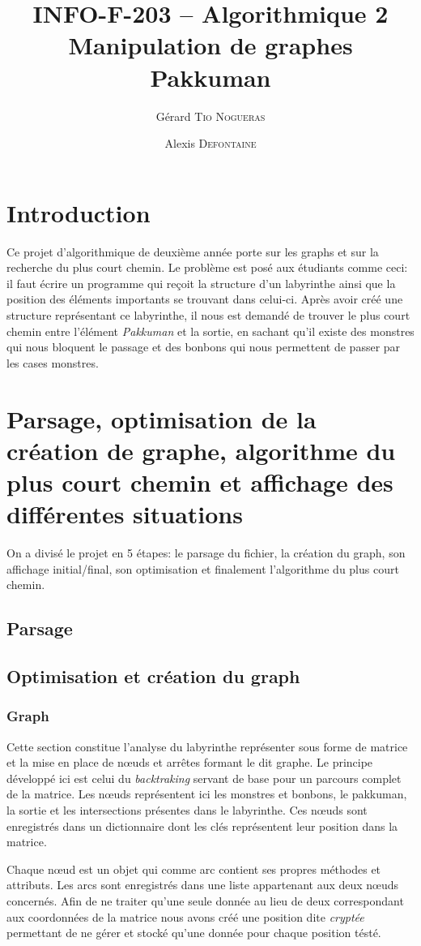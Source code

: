 \documentclass[12pt, oneside]{article}
\title{{\normalsize{INFO-F-203 -- Algorithmique 2}}\\Manipulation de graphes\\ Pakkuman}
\author{Gérard \textsc{Tio Nogueras} \and Alexis \textsc{Defontaine}}
\begin{document}
\maketitle

\section{Introduction}
Ce projet d'algorithmique de deuxième année porte sur les graphs et sur la recherche du plus court chemin.
Le problème est posé aux étudiants comme ceci: il faut écrire un programme qui reçoit la structure d'un labyrinthe ainsi que la position des éléments importants se trouvant dans celui-ci. 
Après avoir créé une structure représentant ce labyrinthe, il nous est demandé de trouver le plus court chemin entre l'élément \emph{Pakkuman} et la sortie, en sachant qu'il existe des monstres qui nous bloquent le passage et des bonbons qui nous permettent de passer par les cases monstres.
\section{Parsage, optimisation de la création de graphe, algorithme du plus court chemin et affichage des différentes situations}
On a divisé le projet en 5 étapes: le parsage du fichier, la création du graph, son affichage initial/final, son optimisation et finalement l'algorithme du plus court chemin.
\subsection{Parsage}

\subsection{Optimisation et création du graph}
\subsubsection{Graph}
Cette section constitue l’analyse du labyrinthe représenter sous forme de matrice et la mise en place de nœuds et arrêtes formant le dit graphe.
Le principe développé ici est celui du \emph{backtraking}  servant de base pour un parcours complet de la matrice. Les nœuds représentent ici les monstres et bonbons, le pakkuman, la sortie et les intersections présentes dans le labyrinthe. Ces nœuds sont enregistrés dans un dictionnaire dont les clés représentent leur position dans la matrice.

Chaque nœud est un objet qui comme arc contient ses propres méthodes et attributs. Les arcs sont enregistrés dans une liste appartenant aux deux nœuds concernés. 
Afin de ne traiter qu’une seule donnée au lieu de deux correspondant aux coordonnées de la matrice nous avons créé une position dite \emph{cryptée} permettant de ne gérer et stocké qu’une donnée pour chaque position tésté.
\end{document}
